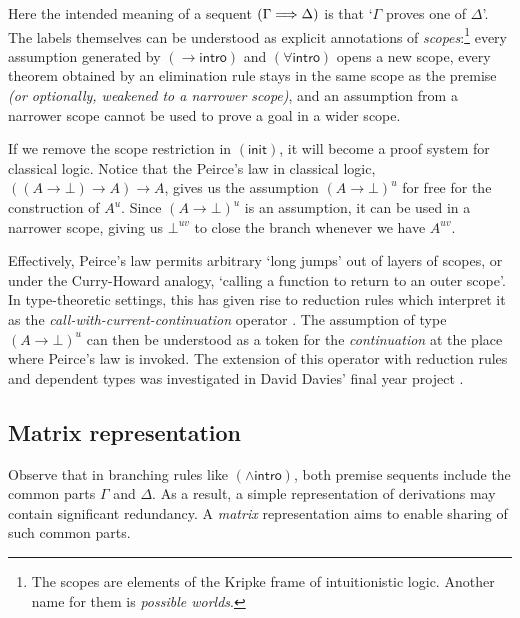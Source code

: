 \documentclass[twoside]{report}
\begin{document}
Here the intended meaning of a sequent $(\Gamma \Longrightarrow \Delta)$ is that `$\Gamma$ proves one of $\Delta$'. The labels themselves can be understood as explicit annotations of \emph{scopes}:\footnote{The scopes are elements of the Kripke frame of intuitionistic logic. Another name for them is \emph{possible worlds}.} every assumption generated by $({\to}\mathsf{intro})$ and $({\forall}\mathsf{intro})$ opens a new scope, every theorem obtained by an elimination rule stays in the same scope as the premise \emph{(or optionally, weakened to a narrower scope)}, and an assumption from a narrower scope cannot be used to prove a goal in a wider scope.

If we remove the scope restriction in $(\mathsf{init})$, it will become a proof system for classical logic. Notice that the Peirce's law in classical logic, $((A \to \bot) \to A) \to A$, gives us the assumption $(A \to \bot)^u$ for free for the construction of $A^u$. Since $(A \to \bot)^u$ is an assumption, it can be used in a narrower scope, giving us $\bot^{uv}$ to close the branch whenever we have $A^{uv}$.

Effectively, Peirce's law permits arbitrary `long jumps' out of layers of scopes, or under the Curry-Howard analogy, `calling a function to return to an outer scope'. In type-theoretic settings, this has given rise to reduction rules which interpret it as the \emph{call-with-current-continuation} operator \cite{griffin1989formulae}. The assumption of type $(A \to \bot)^u$ can then be understood as a token for the \emph{continuation} at the place where Peirce's law is invoked. The extension of this operator with reduction rules and dependent types was investigated in David Davies' final year project \cite{david2021theorem}.

\subsection*{Matrix representation}

\newcommand{\mat}[1]{\begin{bmatrix}#1\end{bmatrix}}

Observe that in branching rules like $(\land\mathsf{intro})$, both premise sequents include the common parts $\Gamma$ and $\Delta$. As a result, a simple representation of derivations may contain significant redundancy. A \emph{matrix} representation \cite{andrews1981theorem,bibel1981matrices,waaler2001connections} aims to enable sharing of such common parts.
\end{document}
